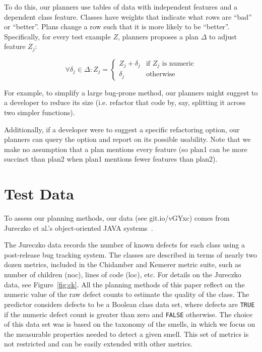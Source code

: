 \documentclass{sig-alternate}
\newcommand{\fig}[1]{Figure~\ref{fig:#1}}
\begin{document}
To do this, our planners use tables of data with independent features and a dependent class feature. Classes have weights  that  indicate  what rows are ``bad'' or ``better''. Plans  change   a row such that it is more likely to be ``better''. Specifically, for every test example $Z$,   planners proposes a  plan $\Delta$ to adjust   feature $Z_j$:

{\small\[
\forall \delta_j \in \Delta :  Z_j =  
\begin{cases}
     Z_j + \delta_j& \text{if $Z_j$ is numeric}\\
    \delta_j              & \text{otherwise}
\end{cases}
\]}

For example, to simplify a  large bug-prone  method, our planners might suggest to a developer to reduce its size (i.e.  refactor that code by, say, splitting it across two simpler functions).

Additionally, if a developer were to suggest a specific refactoring option, our planners can query the option and report on its possible usability. Note that we make no assumption that a plan mentions every feature (so plan1 can be  more succinct than plan2 when plan1  mentions fewer features than plan2).


\section{Test Data}\label{sect:tesd}

To assess our planning methods, our data (see git.io/vGYxc) comes from Jureczko et al.'s object-oriented JAVA systems~\cite{jureczko10}.

The Jureczko data records the number of known defects for each class using a post-release bug tracking system. The classes are described in terms of nearly two dozen metrics, included in the Chidamber and Kemerer metric suite, such as number of children (noc), lines of code (loc), etc. For details on the Jureczko data, see  \fig{ck}. All the planning methods of this paper reflect on the numeric value of the raw defect counts to estimate the quality of the class. The predictor considers defects to be a Boolean class data set, where defects are \texttt{TRUE} if the numeric defect count is greater than zero and \texttt{FALSE} otherwise. The choice of this data set was is based on the taxonomy of the smells, in which we focus on the measurable properties needed to detect a given smell. This set of metrics is not restricted and can be easily extended with other metrics.
\end{document}
